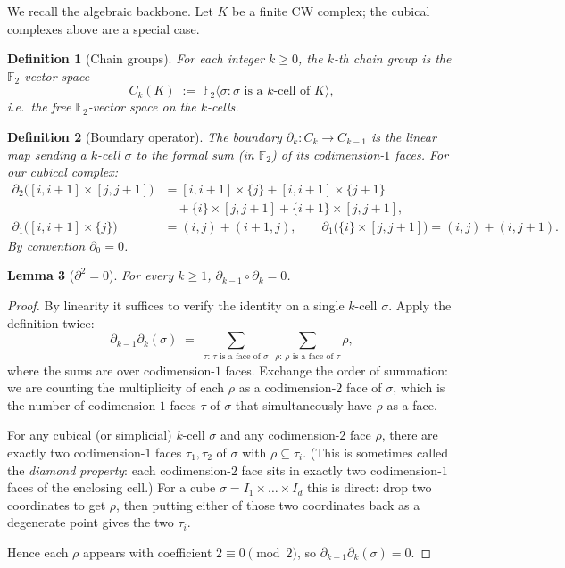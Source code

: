 \documentclass[11pt]{article}
\theoremstyle{persdef}
\newtheorem{definition}{Definition}[section]
\newtheorem{lemma}[definition]{Lemma}
\newcommand{\F}{\mathbb{F}}
\newcommand{\Ftwo}{\F_2}
\newcommand{\Ck}[1]{C_{#1}}
\newcommand{\bnd}{\partial}
\begin{document}
We recall the algebraic backbone. Let $K$ be a finite CW complex; the cubical complexes above are a special case.

\begin{definition}[Chain groups]\label{def:chain}
For each integer $k\geq 0$, the $k$-th \emph{chain group} is the $\Ftwo$-vector space
\[
\Ck{k}(K) \;:=\; \Ftwo\langle \sigma : \sigma\text{ is a $k$-cell of }K\rangle,
\]
i.e.\ the free $\Ftwo$-vector space on the $k$-cells.
\end{definition}

\begin{definition}[Boundary operator]\label{def:bnd}
The \emph{boundary} $\bnd_k:\Ck{k}\to\Ck{k-1}$ is the linear map sending a $k$-cell $\sigma$ to the formal sum (in $\Ftwo$) of its codimension-$1$ faces. For our cubical complex:
\begin{align*}
\bnd_2\bigl([i,i{+}1]\times[j,j{+}1]\bigr)
  &= [i,i{+}1]\times\{j\} + [i,i{+}1]\times\{j{+}1\} \\
  &\quad + \{i\}\times[j,j{+}1] + \{i{+}1\}\times[j,j{+}1],\\
\bnd_1\bigl([i,i{+}1]\times\{j\}\bigr) &= (i,j) + (i{+}1,j),\qquad \bnd_1\bigl(\{i\}\times[j,j{+}1]\bigr) = (i,j) + (i,j{+}1).
\end{align*}
By convention $\bnd_0 = 0$.
\end{definition}

\begin{lemma}[$\bnd^2=0$]\label{lem:dsq}
For every $k\geq 1$, $\bnd_{k-1}\circ\bnd_k = 0$.
\end{lemma}

\begin{proof}
By linearity it suffices to verify the identity on a single $k$-cell $\sigma$. Apply the definition twice:
\[
\bnd_{k-1}\bnd_k(\sigma) \;=\; \sum_{\tau:\,\tau\text{ is a face of }\sigma}\ \sum_{\rho:\,\rho\text{ is a face of }\tau} \rho,
\]
where the sums are over codimension-$1$ faces. Exchange the order of summation: we are counting the multiplicity of each $\rho$ as a codimension-$2$ face of $\sigma$, which is the number of codimension-$1$ faces $\tau$ of $\sigma$ that simultaneously have $\rho$ as a face.

For any cubical (or simplicial) $k$-cell $\sigma$ and any codimension-$2$ face $\rho$, there are exactly two codimension-$1$ faces $\tau_1,\tau_2$ of $\sigma$ with $\rho\subseteq\tau_i$. (This is sometimes called the \emph{diamond property}: each codimension-$2$ face sits in exactly two codimension-$1$ faces of the enclosing cell.) For a cube $\sigma = I_1\times\dots\times I_d$ this is direct: drop two coordinates to get $\rho$, then putting either of those two coordinates back as a degenerate point gives the two $\tau_i$.

Hence each $\rho$ appears with coefficient $2 \equiv 0\pmod 2$, so $\bnd_{k-1}\bnd_k(\sigma) = 0$.
\end{proof}
\end{document}
